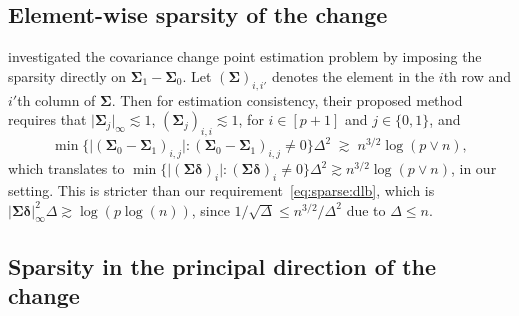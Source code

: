 \documentclass[11pt, a4paper]{article}
\theoremstyle{definition}
\theoremstyle{definition}
\theoremstyle{definition}
\theoremstyle{definition}
\theoremstyle{definition}
\theoremstyle{remark}
\theoremstyle{definition}
\theoremstyle{definition}
\theoremstyle{definition}
\begin{document}
\subsection{Element-wise sparsity of the change}

\citet{DePaYa22} investigated the covariance change point estimation problem by imposing the sparsity directly on $\bm\Sigma_1 - \bm\Sigma_0$.
Let $(\bm\Sigma)_{i, i'}$ denotes the element in the $i$th row and $i'$th column of $\bm\Sigma$.
Then for estimation consistency, their proposed method requires that 
$\vert\bm\Sigma_j\vert_{\infty}\lesssim 1$, $(\bm\Sigma_j)_{i,i} \lesssim 1$, for $i \in[p+1]$ and $j\in\{0,1\}$, and 
$$
\min\bigl\{\vert(\bm\Sigma_0 - \bm\Sigma_1)_{i,j}\vert :  (\bm\Sigma_0 - \bm\Sigma_1)_{i,j} \neq 0\bigr\} \Delta^2  \; \gtrsim\; n^{3/2}\log(p\vee n),
$$
which translates to $\min\bigl\{\vert(\bm\Sigma\bm\delta)_{i}\vert : (\bm\Sigma\bm\delta)_{i} \neq 0\bigr\} \Delta^2 \gtrsim n^{3/2} \log(p\vee n)$, in our setting. 
This is stricter than our requirement~\eqref{eq:sparse:dlb}, which is $\vert\bm\Sigma\bm\delta\vert_{\infty}^2 \Delta \gtrsim \log(p \log(n))$, since  $1/\sqrt{\Delta} \le n^{3/2}/\Delta^2$ due to $\Delta \le n$.

\subsection{Sparsity in the principal direction of the change}
\end{document}
